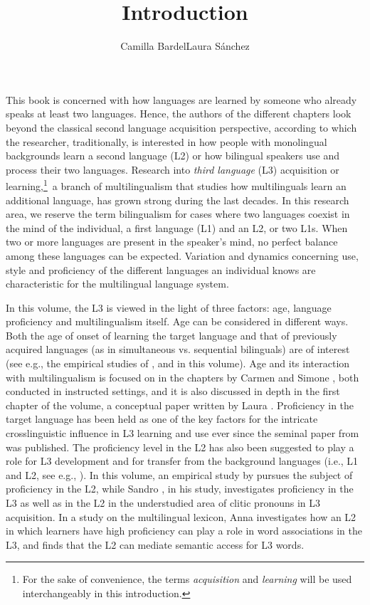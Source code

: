\documentclass[output=paper,colorlinks,citecolor=brown,nonflat]{langsci/langscibook}
\author{Camilla Bardel\affiliation{Stockholm University}\lastand Laura Sánchez\affiliation{Stockholm University}}
\title{Introduction}
\begin{document}
\maketitle

This book is concerned with how languages are learned by someone who already speaks at least two languages. Hence, the authors of the different chapters look beyond the classical second language acquisition perspective, according to which the researcher, traditionally, is interested in how people with monolingual backgrounds learn a second language (L2) or how bilingual speakers use and process their two languages. Research into \textit{third language} (L3) acquisition or learning,\footnote{For the sake of convenience, the terms \textit{acquisition} and \textit{learning} will be used interchangeably in this introduction.}~a branch of multilingualism that studies how multilinguals learn an additional language, has grown strong during the last decades. In this research area, we reserve the term bilingualism for cases where two languages coexist in the mind of the individual, a first language (L1) and an L2, or two L1s. When two or more languages are present in the speaker’s mind, no perfect balance among these languages can be expected. Variation and dynamics concerning use, style and proficiency of the different languages an individual knows are characteristic for the multilingual language system.

In this volume, the L3 is viewed in the light of three factors: age, language proficiency and multilingualism itself. Age can be considered in different ways. Both the age of onset of learning the target language and that of previously acquired languages (as in simultaneous vs. sequential bilinguals) are of interest (see e.g., the empirical studies of \citeauthor{chapters/munoz}, \citeauthor{chapters/pfenninger} and \citeauthor{chapters/sanchez7} in this volume). Age and its interaction with multilingualism is focused on in the chapters by Carmen \citeauthor{chapters/munoz} and Simone \citeauthor{chapters/pfenninger}, both conducted in instructed settings, and it is also discussed in depth in the first chapter of the volume, a conceptual paper written by Laura \citeauthor{chapters/sanchez1}. Proficiency in the target language has been held as one of the key factors for the intricate crosslinguistic influence in L3 learning and use ever since the seminal paper from \citet{WilliamsHammarberg1998} was published. The proficiency level in the L2 has also been suggested to play a role for L3 development and for transfer from the background languages (i.e., L1 and L2, see e.g., \citealt{BardelLindqvist2007, SánchezBardel2017Transfer}). In this volume, an empirical study by \citeauthor{chapters/sanchez7} pursues the subject of proficiency in the L2, while Sandro \citeauthor{chapters/sciutti}, in his study, investigates proficiency in the L3 as well as in the L2 in the understudied area of clitic pronouns in L3 acquisition. In a study on the multilingual lexicon, Anna \citeauthor{chapters/gudmundson} investigates how an L2 in which learners have high proficiency can play a role in word associations in the L3, and finds that the L2 can mediate semantic access for L3 words.
\end{document}
